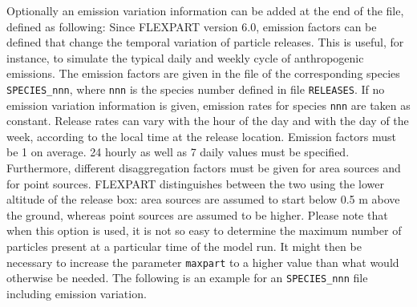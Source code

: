 \documentclass{egu}                  %
\begin{document}
Optionally an emission variation information can be added at the end of the
file, defined as following: Since FLEXPART version 6.0, emission factors can be
defined that change the temporal variation of particle releases.  This is
useful, for instance, to simulate the typical daily and weekly cycle of
anthropogenic emissions.  The emission factors are given in the file of the
corresponding species \verb|SPECIES_nnn|, where \verb|nnn| is the species
number defined in file \verb|RELEASES|.  If no emission variation information
is given, emission rates for species \verb|nnn| are taken as constant.  Release
rates can vary with the hour of the day and with the day of the week, according
to the local time at the release location.  Emission factors must be 1 on
average.  24 hourly as well as 7 daily values must be specified.  Furthermore,
different disaggregation factors must be given for area sources and for point
sources.  FLEXPART distinguishes between the two using the lower altitude of
the release box: area sources are assumed to start below 0.5 m above the
ground, whereas point sources are assumed to be higher.  Please note that when
this option is used, it is not so easy to determine the maximum number of
particles present at a particular time of the model run.  It might then be
necessary to increase the parameter \verb|maxpart| to a higher value than what
would otherwise be needed.  The following is an example for an
\verb|SPECIES_nnn| file including emission variation.
\end{document}
